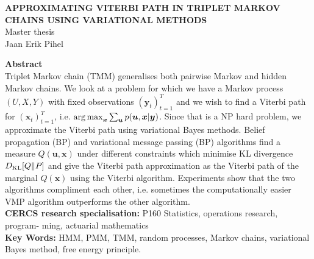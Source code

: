 \small{

\begin{center}
\MakeUppercase{\textbf{Approximating Viterbi path in triplet Markov Chains using variational methods}}\\
Master thesis \\
Jaan Erik Pihel\\
\end{center}

\normalsize{\textbf{Abstract}}\\
Triplet Markov chain (TMM) generalises both pairwise Markov and hidden Markov chains. We look at a problem for which we have a Markov process $(U,X,Y)$ with fixed observations $(\bm{y}_t)_{t=1}^T$ and we wish to find a Viterbi path for $(\bm{x}_t)_{t=1}^T$, i.e. $\operatorname*{arg\,max}_{\bm{x}} \sum_{\bm{u}}p(\bm{u},\bm{x}|\bm{y})$. Since that is a NP hard problem, we approximate the Viterbi path using variational Bayes methods. Belief propagation (BP) and variational message passing (BP) algorithms find a measure $Q(\bm{u},\bm{x})$ under different constraints which minimise KL divergence $D_{\mathrm{KL}}[Q \| P]$ and give the Viterbi path approximation as the Viterbi path of the marginal $Q(\bm{x})$ using the Viterbi algorithm. Experiments show that the two algorithms compliment each other, i.e. sometimes the computationally easier VMP algorithm outperforms the other algorithm. \\
\textbf{CERCS research specialisation:} P160 Statistics, operations research, program- ming, actuarial mathematics\\
\textbf{Key Words:} HMM, PMM, TMM, random processes, Markov chains, variational Bayes method, free energy principle.\\
}
